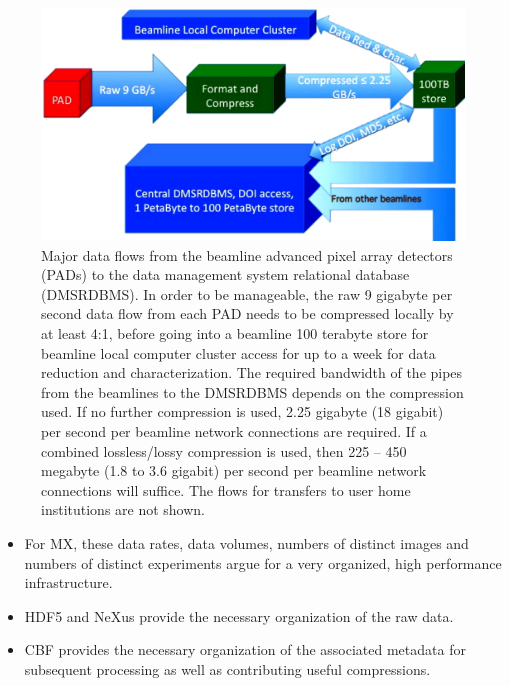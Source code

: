 \documentclass[11pt]{a0poster}
\begin{document}
\begin{minipage}[]{0.29\linewidth}
\vspace{-6mm}%
\begin{figure}[H]
\begin{center}
\includegraphics[width=175mm]{PAD_TO_DMSRDBMS_6}
\caption{\fontsize{16}{20}\selectfont%
Major data flows from the beamline advanced pixel array detectors (PADs) to the data
management system relational database (DMSRDBMS).  In order to be manageable, the
raw 9 gigabyte per second data flow from each PAD needs to be compressed locally
by at least 4:1, before going into a beamline 100 terabyte store for beamline local computer cluster
access for up to a week for  data reduction and characterization. 
The required bandwidth of the pipes from the beamlines to the DMSRDBMS depends on the compression used.  
If no further compression is used, 2.25 gigabyte (18 gigabit) per second per beamline network connections are required.  If a combined lossless/lossy compression is used, then 225 -- 450 megabyte (1.8 to 3.6 gigabit) per second per beamline network connections will suffice.  The flows for transfers
to user home institutions are not shown.}
\label{PAD_TO_DMSRDBMS_4}
\end{center}
\end{figure}

\vspace{-4mm}%
\begin{itemize}
\item{For MX, these data rates, data volumes, numbers of distinct images and numbers of distinct experiments argue for a very organized, high performance infrastructure.}
\item{HDF5 and NeXus provide the necessary organization of the raw data.}
\item{CBF provides the necessary organization of the associated metadata for subsequent processing
as well as contributing useful compressions.}
\end{itemize}


\end{minipage}
\end{document}
